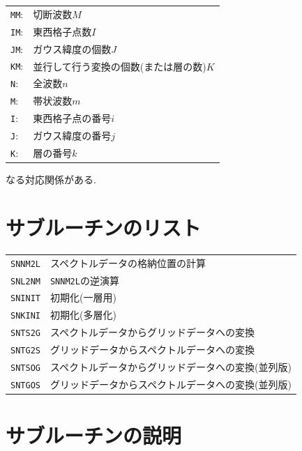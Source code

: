 \documentclass[a4j,fleqn]{jarticle}
\begin{document}
\begin{flushleft}
\begin{tabular}{ll}
{\tt MM}:& 切断波数$M$\\
{\tt IM}:& 東西格子点数$I$\\
{\tt JM}:& ガウス緯度の個数$J$\\
{\tt KM}:& 並行して行う変換の個数(または層の数)$K$\\
{\tt N}:& 全波数$n$\\
{\tt M}:& 帯状波数$m$\\
{\tt I}:& 東西格子点の番号$i$\\
{\tt J}:& ガウス緯度の番号$j$\\
{\tt K}:& 層の番号$k$
\end{tabular}
\end{flushleft}

なる対応関係がある. 


\section{サブルーチンのリスト}

\vspace{1em}
\begin{tabular}{ll}
{\tt SNNM2L} & スペクトルデータの格納位置の計算\\
{\tt SNL2NM} & {\tt SNNM2L}の逆演算\\
{\tt SNINIT} & 初期化(一層用)\\
{\tt SNKINI} & 初期化(多層化)\\
{\tt SNTS2G} & スペクトルデータからグリッドデータへの変換\\
{\tt SNTG2S} & グリッドデータからスペクトルデータへの変換\\
{\tt SNTSOG} & スペクトルデータからグリッドデータへの変換(並列版)\\
{\tt SNTGOS} & グリッドデータからスペクトルデータへの変換(並列版)
\end{tabular}


\section{サブルーチンの説明}

\end{document}
